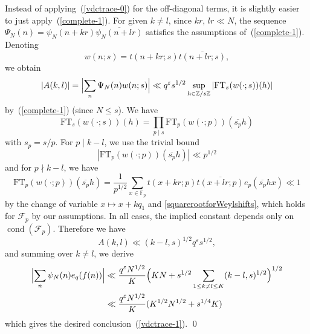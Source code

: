 \documentclass[12pt,a4paper,reqno]{amsart}
\numberwithin{equation}{section}
\DeclareMathOperator*\cond{cond}
\newcommand{\FT}{\mathrm{FT}}
\theoremstyle{plain}
\theoremstyle{definition}
\newcommand\F{\mathbb{F}}
\newcommand\Z{\mathbb{Z}}
\newcommand\eps{\varepsilon}
\newcommand\ov{\overline}
\newcommand\mcF{\mathcal{F}}
\newcommand\Fp{\F_{p}}
\def\stacksum#1#2{{\stackrel{{\scriptstyle #1}}
{{\scriptstyle #2}}}}
\newcommand{\mods}[1]{\,(\mathrm{mod}\,{#1})}
\newcommand\sumsum{\mathop{\sum\sum}\limits}
\renewcommand{\lessapprox}{\llcurly}
\begin{document}
Instead of applying~(\ref{vdctrace-0}) for the off-diagonal terms, it
is slightly easier to just apply~(\ref{complete-1}). For given
$k\neq l$, since $kr$, $lr\ll N$, the sequence $\Psi_N(n)=\psi_N(n+kr)
\overline{\psi_N(n+lr)}$ satisfies the assumptions
of~(\ref{complete-1}). Denoting
$$
w(n;s)=t(n+kr;s)\overline{t(n+lr;s)},
$$
we obtain 
$$
|A(k,l)|=\Bigl|\sum_n \Psi_{N}(n)w(n;s)\Bigr| \ll
q^{\eps}s^{1/2}\sup_{h\in\Z/s\Z}|\FT_{s}(w(\cdot;s))(h)|
$$
by~(\ref{complete-1}) (since $N\leq s$). We have
$$
\FT_s(w(\cdot;s))(h)= \prod_{p\mid s}\FT_p(w(\cdot;p))(\ov{s_p}h)
$$
with $s_p=s/p$. For $p\mid k-l$, we use the trivial bound
$$
|\FT_p(w(\cdot;p))(\ov{s_p}h)|\ll p^{1/2}
$$
and for $p\nmid k-l$, we have
$$
\FT_p(w(\cdot;p))(\ov{s_p}h) =\frac{1}{p^{1/2}}
\sum_{x\in\Fp}t(x+kr;p)\ov{t(x+lr;p)}e_p(\ov{s_p}hx)\ll 1
$$
by the change of variable $x\mapsto x+kq_1$ and
\eqref{squarerootforWeylshifts}, which holds for $\mcF_p$ by our
assumptions. In all cases, the implied constant depends only on
$\cond(\mcF_p)$. Therefore we have
$$
A(k,l)\ll (k-l,s)^{1/2}q^{\eps}s^{1/2},
$$
and summing over $k\neq l$, we derive
\begin{align*}
  \Bigl|\sum_n \psi_N(n) e_q(f(n))\Bigr|&\ll \frac{q^{\eps}N^{1/2}}{K}
  \Bigl(KN+s^{1/2}\sum_{1\leq k\neq l\leq K}(k-l,s)^{1/2}\Bigr)^{1/2}
  \\
  &\ll \frac{q^{\eps}N^{1/2}}{K} (K^{1/2}N^{1/2}+s^{1/4}K)
\end{align*}
which gives the desired conclusion~(\ref{vdctrace-1}).
\qed
\end{document}

